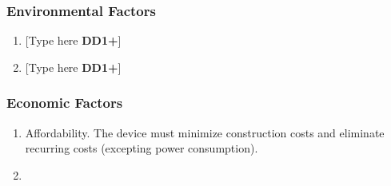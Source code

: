 \subsubsection{Environmental Factors}
\begin{enumerate}
    \item {[Type here \textbf{DD1+}]}
    \item {[Type here \textbf{DD1+}]}
\end{enumerate}

\subsubsection{Economic Factors}
\begin{enumerate}
    \item Affordability. The device must minimize
          construction costs and eliminate recurring
          costs (excepting power consumption).
    \item
\end{enumerate}